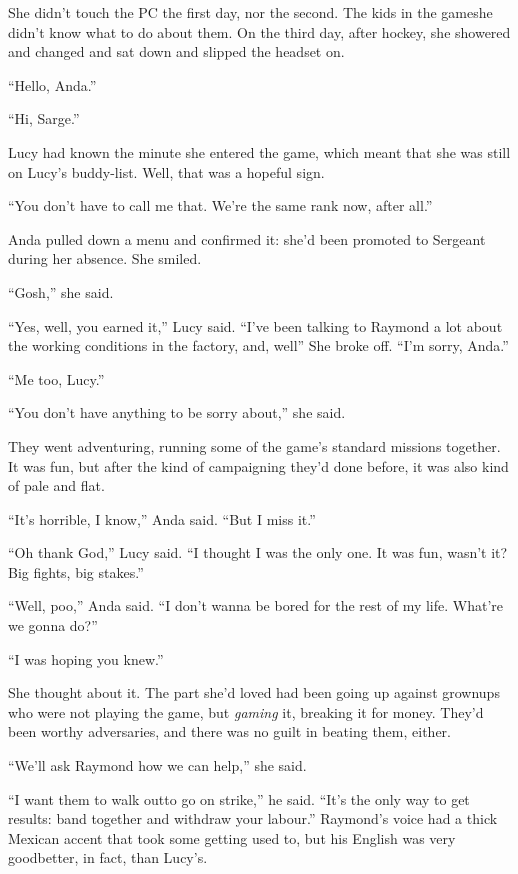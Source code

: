\tb

She didn’t touch the PC the first day, nor the second. The kids in
the game\dash{}she didn’t know what to do about them. On the third day,
after hockey, she showered and changed and sat down and slipped the
headset on.

“Hello, Anda.”

“Hi, Sarge.”

Lucy had known the minute she entered the game, which meant that
she was still on Lucy’s buddy-list. Well, that was a hopeful sign.

“You don’t have to call me that. We’re the same rank now, after
all.”

Anda pulled down a menu and confirmed it: she’d been promoted to
Sergeant during her absence. She smiled.

“Gosh,” she said.

“Yes, well, you earned it,” Lucy said. “I’ve been talking to
Raymond a lot about the working conditions in the factory, and,
well\dash{}” She broke off. “I’m sorry, Anda.”

“Me too, Lucy.”

“You don’t have anything to be sorry about,” she said.

They went adventuring, running some of the game’s standard missions
together. It was fun, but after the kind of campaigning they’d done
before, it was also kind of pale and flat.

“It’s horrible, I know,” Anda said. “But I miss it.”

“Oh thank God,” Lucy said. “I thought I was the only one. It was
fun, wasn’t it? Big fights, big stakes.”

“Well, poo,” Anda said. “I don’t wanna be bored for the rest of my
life. What’re we gonna do?”

“I was hoping you knew.”

She thought about it. The part she’d loved had been going up
against grownups who were not playing the game, but \emph{gaming}
it, breaking it for money. They’d been worthy adversaries, and
there was no guilt in beating them, either.

“We’ll ask Raymond how we can help,” she said.

\tb

“I want them to walk out\dash{}to go on strike,” he said. “It’s the only
way to get results: band together and withdraw your labour.”
Raymond’s voice had a thick Mexican accent that took some getting
used to, but his English was very good\dash{}better, in fact, than
Lucy’s.

